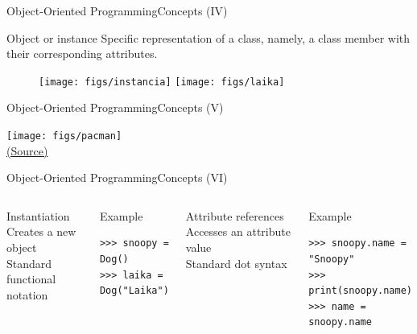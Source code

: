 \documentclass[10pt,compress]{beamer} %
\begin{document}
\begin{frame}{Object-Oriented Programming}{Concepts (IV)}
	\vfill\begin{block}{Object or instance}
		 Specific representation of a class, namely, a class member with their corresponding attributes.
  	\end{block}	  	
		\begin{figure}
			\texttt{[image: figs/instancia]}\hfill
			\texttt{[image: figs/laika]}
		\end{figure}				
\end{frame}

\begin{frame}[plain]{Object-Oriented Programming}{Concepts (V)}
	\begin{center}
	\texttt{[image: figs/pacman]}\\
	\smallskip
	\tiny{\href{http://blog.sklambert.com/introduction-to-oop-for-game-development/}{(Source)}}
	\end{center}
\end{frame}

\begin{frame}[fragile]{Object-Oriented Programming}{Concepts (VI)}
    \begin{columns}
	   		\begin{block}{Instantiation}
			Creates a new object\\
			Standard functional notation\\
			\bigskip
			\\
	   		\end{block}
	   		\begin{exampleblock}{Example}
\begin{verbatim}
>>> snoopy = Dog()
>>> laika = Dog("Laika")
\end{verbatim}
	   		\end{exampleblock}

	   		\begin{block}{Attribute references}
			Accesses an attribute value\\
			Standard dot syntax\\
			\bigskip
			\\
	   		\end{block}
	   		\begin{exampleblock}{Example}
\begin{verbatim}
>>> snoopy.name = "Snoopy"
>>> print(snoopy.name)
>>> name = snoopy.name
\end{verbatim}
	   		\end{exampleblock}
	\end{columns}
\end{frame}
\end{document}
